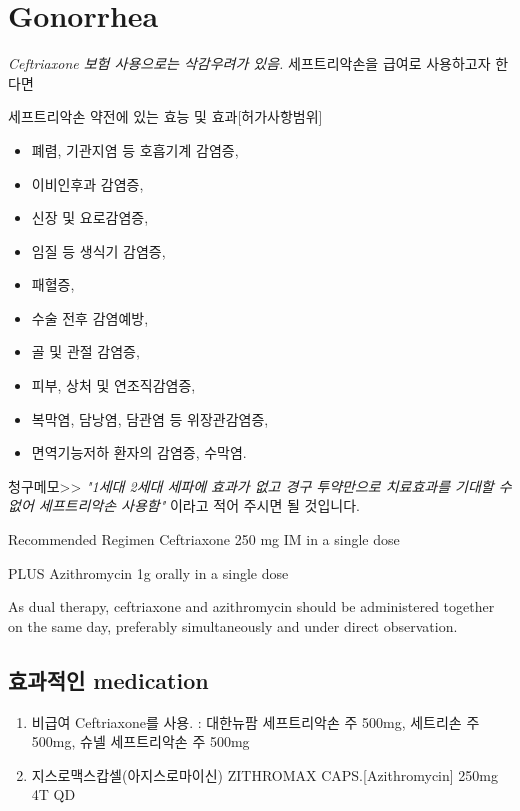 \section{Gonorrhea}
{
\emph{Ceftriaxone 보험 사용으로는 삭감우려가 있음.}
세프트리악손을 급여로 사용하고자 한다면\par
세프트리악손 약전에 있는 효능 및 효과[허가사항범위]
\begin{itemize}\tightlist
\item 폐렴, 기관지염 등 호흡기계 감염증, 
\item 이비인후과 감염증, 
\item 신장 및 요로감염증, 
\item 임질 등 생식기 감염증, 
\item 패혈증, 
\item 수술 전후 감염예방, 
\item 골 및 관절 감염증, 
\item 피부, 상처 및 연조직감염증, 
\item 복막염, 담낭염, 담관염 등 위장관감염증, 
\item 면역기능저하 환자의 감염증, 수막염.
\end{itemize}
청구메모>>  \emph{"1세대 2세대 세파에 효과가 없고 경구 투약만으로 치료효과를 기대할 수 없어 세프트리악손 사용함"} 이라고 적어 주시면 될 것입니다.
}
\begin{commentbox}{Recommended Regimen}
Ceftriaxone 250 mg IM in a single dose \par
PLUS Azithromycin 1g orally in a single dose \par
As dual therapy, ceftriaxone and azithromycin should be administered together on the same day, preferably simultaneously and under direct observation.
\end{commentbox}

\subsection{효과적인 medication}
\begin{enumerate}\tightlist
\item 비급여 Ceftriaxone를 사용. : 대한뉴팜 세프트리악손 주 500mg, 세트리손 주 500mg, 슈넬 세프트리악손 주 500mg
\item 지스로맥스캅셀(아지스로마이신)  ZITHROMAX CAPS.[Azithromycin] 250mg 4T QD 
\end{enumerate}
